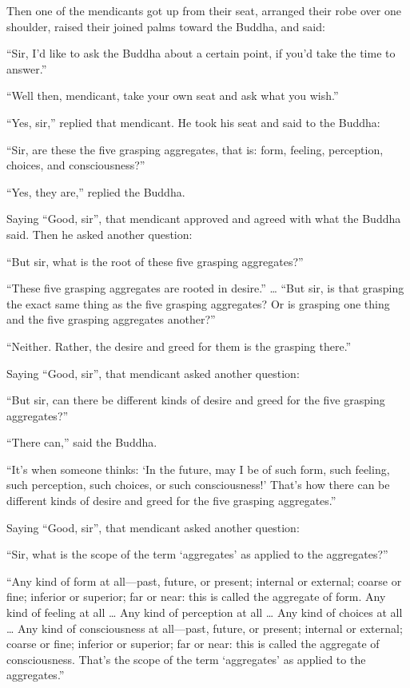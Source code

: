 \documentclass[12pt,openany]{book}%
\begin{document}
Then one of the mendicants got up from their seat, arranged their robe over one shoulder, raised their joined palms toward the Buddha, and said: 

“Sir, I’d like to ask the Buddha about a certain point, if you’d take the time to answer.” 

“Well then, mendicant, take your own seat and ask what you wish.” 

“Yes, sir,” replied that mendicant. He took his seat and said to the Buddha: 

“Sir, are these the five grasping aggregates, that is: form, feeling, perception, choices, and consciousness?” 

“Yes, they are,” replied the Buddha. 

Saying “Good, sir”, that mendicant approved and agreed with what the Buddha said. Then he asked another question: 

“But sir, what is the root of these five grasping aggregates?” 

“These five grasping aggregates are rooted in desire.” … “But sir, is that grasping the exact same thing as the five grasping aggregates? Or is grasping one thing and the five grasping aggregates another?” 

“Neither. Rather, the desire and greed for them is the grasping there.” 

Saying “Good, sir”, that mendicant asked another question: 

“But sir, can there be different kinds of desire and greed for the five grasping aggregates?” 

“There can,” said the Buddha. 

“It’s when someone thinks: ‘In the future, may I be of such form, such feeling, such perception, such choices, or such consciousness!’ That’s how there can be different kinds of desire and greed for the five grasping aggregates.” 

Saying “Good, sir”, that mendicant asked another question: 

“Sir, what is the scope of the term ‘aggregates’ as applied to the aggregates?” 

“Any kind of form at all—past, future, or present; internal or external; coarse or fine; inferior or superior; far or near: this is called the aggregate of form. Any kind of feeling at all … Any kind of perception at all … Any kind of choices at all … Any kind of consciousness at all—past, future, or present; internal or external; coarse or fine; inferior or superior; far or near: this is called the aggregate of consciousness. That’s the scope of the term ‘aggregates’ as applied to the aggregates.” 
\end{document}
